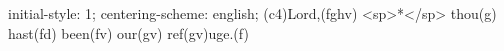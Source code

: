 initial-style: 1;
centering-scheme: english;
(c4)Lord,(fghv) <sp>*</sp> thou(g) hast(fd) been(fv) our(gv) ref(gv)uge.(f)
